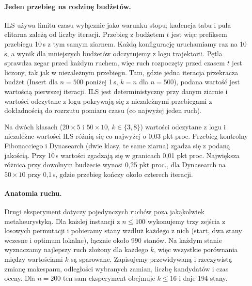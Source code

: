 \documentclass[letterpaper]{article} %
\theoremstyle{definition}
\begin{document}
\paragraph{Jeden przebieg na rodzinę budżetów.} ILS używa limitu czasu wyłącznie jako warunku stopu; kadencja tabu i pula elitarna zależą od liczby iteracji. Przebieg z budżetem $t$ jest więc prefiksem przebiegu 10\,s z tym samym ziarnem. Każdą konfigurację
uruchamiamy raz na 10\,s, a wynik dla mniejszych budżetów odczytujemy
z logu trajektorii. Pętla sprawdza zegar przed każdym ruchem, więc ruch rozpoczęty przed czasem $t$ jest liczony, tak jak w niezależnym przebiegu. Tam, gdzie jedna iteracja
przekracza budżet (Insert dla $n=500$ poniżej 1\,s, $k=n$ dla $n=500$),
podana wartość jest wartością pierwszej iteracji. ILS jest
deterministyczny przy danym ziarnie i wartości odczytane z logu pokrywają
się z niezależnymi przebiegami z dokładnością do rozrzutu pomiaru czasu (co najwyżej
jeden ruch).

Na dwóch klasach ($20\times 5$ i $50\times 10$, $k\in\{3,8\}$) wartości
odczytane z logu i niezależne wartości ILS różnią się co najwyżej
o 0,03 pkt proc. Przebieg kontrolny Fibonacciego i Dynasearch (dwie klasy, te same ziarna)
zgadza się z podaną jakością. Przy 10\,s wartości zgadzają się
w granicach 0,01 pkt proc. Największa różnica przy dowolnym budżecie
wynosi 0,25 pkt proc., dla Dynasearch na $50\times 10$ przy 0,1\,s, gdzie
przebieg kończy około czterech iteracji.

\paragraph{Anatomia ruchu.} Drugi eksperyment dotyczy pojedynczych ruchów
poza jakąkolwiek metaheurystyką. Dla każdej instancji z $n\leq 100$
wykonujemy trzy zejścia z losowych permutacji i pobieramy stany wzdłuż
każdego z nich (start, dwa stany wczesne i optimum lokalne), łącznie
około 990 stanów. Na każdym stanie wyznaczamy najlepszy ruch złożony dla
każdego $k$, więc wszystkie porównania między wartościami $k$ są
sparowane. Zapisujemy przewidywaną i rzeczywistą zmianę makespanu,
odległości wybranych zamian, liczbę kandydatów i czas oceny.
Dla $n=200$ ten sam eksperyment obejmuje $k\leq 16$ i daje 194 stany.
\end{document}
